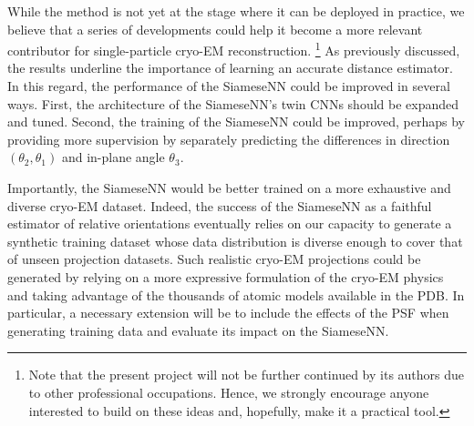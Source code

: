 While the method is not yet at the stage where it can be deployed in practice, we believe that a series of developments could help it become a more relevant contributor for single-particle cryo-EM reconstruction.%
\footnote{Note that the present project will not be further continued by its authors due to other professional occupations. Hence, we strongly encourage anyone interested to build on these ideas and, hopefully, make it a practical tool.}
As previously discussed, the results underline the importance of learning an accurate distance estimator. %
In this regard, the performance of the SiameseNN could be improved in several ways.
First, the architecture of the SiameseNN's twin CNNs should be expanded and tuned.
Second, the training of the SiameseNN could be improved, perhaps by providing more supervision by separately predicting the differences in direction $(\theta_2,\theta_1)$ and in-plane angle $\theta_3$.


Importantly, the SiameseNN would be better trained on a more exhaustive and diverse cryo-EM dataset.
Indeed, the success of the SiameseNN as a faithful estimator of relative orientations eventually relies on our capacity to generate a synthetic training dataset whose data distribution is diverse enough to cover that of unseen projection datasets.
Such realistic cryo-EM projections could be generated by relying on a more expressive formulation of the cryo-EM physics and taking advantage of the thousands of atomic models available in the PDB\@.
In particular, a necessary extension will be to include the effects of the PSF when generating training data and evaluate its impact on the SiameseNN\@. %

